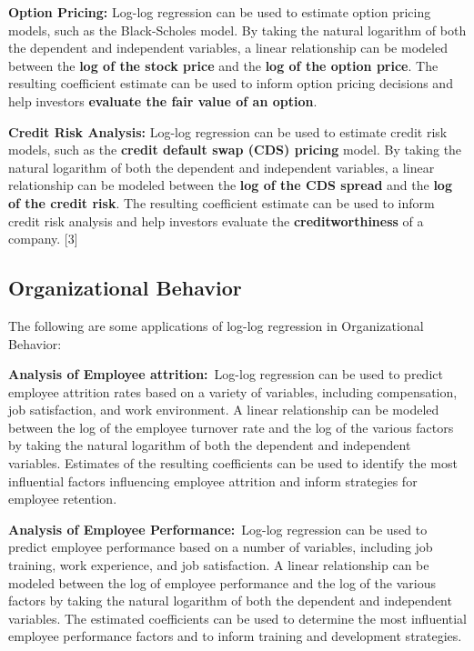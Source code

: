 \documentclass[
  letterpaper,
  DIV=11,
  numbers=noendperiod]{scrreport}
\begin{document}
\textbf{Option Pricing:} Log-log regression can be used to estimate
option pricing models, such as the Black-Scholes model. By taking the
natural logarithm of both the dependent and independent variables, a
linear relationship can be modeled between the \textbf{log of the stock
price} and the \textbf{log of the option price}. The resulting
coefficient estimate can be used to inform option pricing decisions and
help investors \textbf{evaluate the fair value of an option}.

\textbf{Credit Risk Analysis:} Log-log regression can be used to
estimate credit risk models, such as the \textbf{credit default swap
(CDS) pricing} model. By taking the natural logarithm of both the
dependent and independent variables, a linear relationship can be
modeled between the \textbf{log of the CDS spread} and the \textbf{log
of the credit risk}. The resulting coefficient estimate can be used to
inform credit risk analysis and help investors evaluate the
\textbf{creditworthiness} of a company. {[}3{]}

\subsection{Organizational Behavior}\label{organizational-behavior}

The following are some applications of log-log regression in
Organizational Behavior:

\textbf{Analysis of Employee attrition:}~Log-log regression can be used
to predict employee attrition rates based on a variety of variables,
including compensation, job satisfaction, and work environment. A linear
relationship can be modeled between the log of the employee turnover
rate and the log of the various factors by taking the natural logarithm
of both the dependent and independent variables. Estimates of the
resulting coefficients can be used to identify the most influential
factors influencing employee attrition and inform strategies for
employee retention.

\textbf{Analysis of Employee Performance:}~Log-log regression can be
used to predict employee performance based on a number of variables,
including job training, work experience, and job satisfaction. A linear
relationship can be modeled between the log of employee performance and
the log of the various factors by taking the natural logarithm of both
the dependent and independent variables. The estimated coefficients can
be used to determine the most influential employee performance factors
and to inform training and development strategies.
\end{document}
